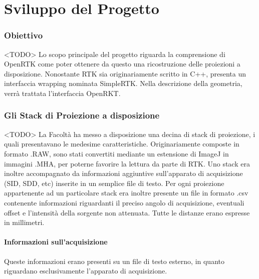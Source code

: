 \documentclass[a4paper,11pt, oneside]{article}
\begin{document}
                   
                    
                    
                                  
    \part{Sviluppo del Progetto}
        \section{Obiettivo}
            <TODO>
            Lo scopo principale del progetto riguarda la comprensione di OpenRTK come poter ottenere da questo una ricostruzione delle proiezioni a disposizione.
            Nonostante RTK sia originariamente scritto in C++, presenta un interfaccia wrapping nominata SimpleRTK. Nella descrizione della geometria, verrà trattata l'interfaccia OpenRKT.
         
        \section{Gli Stack di Proiezione a disposizione}
            <TODO>
            La Facoltà ha messo a disposizione una decina di stack di proiezione, i quali presentavano le medesime caratteristiche. Originariamente composte in formato .RAW, sono stati convertiti mediante un estensione di ImageJ in immagini .MHA, per poterne favorire la lettura da parte di RTK. Uno stack era inoltre accompagnato da informazioni aggiuntive sull'apparato di acquisizione (SID, SDD, etc) inserite in un semplice file di testo. Per ogni proiezione appartenente ad un particolare stack era inoltre presente un file in formato .csv contenente informazioni riguardanti il preciso angolo di acquisizione, eventuali offset e l'intensità della sorgente non attenuata.
            Tutte le distanze erano espresse in millimetri.
            
            \subsection{Informazioni sull'acquisizione}
                \par
                    Queste informazioni erano presenti su un file di testo esterno, in quanto riguardano esclusivamente l'apparato di acquisizione. 
                    
\end{document}
